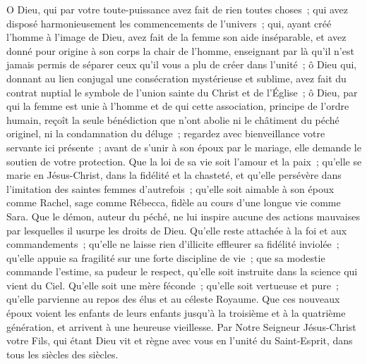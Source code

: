 \documentclass[10.5pt,latin,french,a5paper]{book}
\begin{document}
{O Dieu, qui par votre toute-puissance avez fait de rien toutes choses~; qui avez disposé harmonieusement les commencements de l'univers~; qui, ayant créé l'homme à l'image de Dieu, avez fait de la femme son aide inséparable, et avez donné pour origine à son corps la chair de l'homme, enseignant par là qu'il n'est jamais permis de séparer ceux qu'il vous a plu de créer dans l'unité~; ô Dieu qui, donnant au lien conjugal une consécration mystérieuse et sublime, avez fait du contrat nuptial le symbole de l'union sainte du Christ et de l'Église~; ô Dieu, par qui la femme est unie à l'homme et de qui cette association, principe de l'ordre humain, reçoît la seule bénédiction que n'ont abolie ni le châtiment du péché originel, ni la condamnation du déluge~; regardez avec bienveillance votre servante ici présente~; avant de s'unir à son époux par le mariage, elle demande le soutien de votre protection. Que la loi de sa vie soit l'amour et la paix~; qu'elle se marie en Jésus-Christ, dans la fidélité et la chasteté, et qu'elle persévère dans l'imitation des saintes femmes d'autrefois~; qu'elle soit aimable à son époux comme Rachel, sage comme Rébecca, fidèle au cours d'une longue vie comme Sara. Que le démon, auteur du péché, ne lui inspire aucune des actions mauvaises par lesquelles il usurpe les droits de Dieu. Qu'elle reste attachée à la foi et aux commandements~; qu'elle ne laisse rien d'illicite effleurer sa fidélité inviolée~; qu'elle appuie sa fragilité sur une forte discipline de vie~; que sa modestie commande l'estime, sa pudeur le respect, qu'elle soit instruite dans la science qui vient du Ciel. Qu'elle soit une mère féconde~; qu'elle soit vertueuse et pure~; qu'elle parvienne au repos des élus et au céleste Royaume. Que ces nouveaux époux voient les enfants de leurs enfants jusqu'à la troisième et à la quatrième génération, et arrivent à une heureuse vieillesse. Par Notre Seigneur Jésus-Christ votre Fils, qui étant Dieu vit et règne avec vous en l'unité du Saint-Esprit, dans tous les siècles des siècles. }

\end{document}
